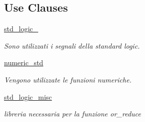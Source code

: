 \subsection*{Use Clauses}
 \begin{DoxyCompactItemize}
\item 
\mbox{\label{classUART__v1__0__S00__AXI_acd03516902501cd1c7296a98e22c6fcb}} 
\hyperlink{classUART__v1__0__S00__AXI_acd03516902501cd1c7296a98e22c6fcb}{std\+\_\+logic\+\_}   
\begin{DoxyCompactList}\small\item\em Sono utilizzati i segnali della standard logic. \end{DoxyCompactList}\item 
\mbox{\label{classUART__v1__0__S00__AXI_a2edc34402b573437d5f25fa90ba4013e}} 
\hyperlink{classUART__v1__0__S00__AXI_a2edc34402b573437d5f25fa90ba4013e}{numeric\+\_\+std}   
\begin{DoxyCompactList}\small\item\em Vengono utilizzate le funzioni numeriche. \end{DoxyCompactList}\item 
\mbox{\label{classUART__v1__0__S00__AXI_acb2d98d781f19c8f5f4109576ec45502}} 
\hyperlink{classUART__v1__0__S00__AXI_acb2d98d781f19c8f5f4109576ec45502}{std\+\_\+logic\+\_\+misc}   
\begin{DoxyCompactList}\small\item\em libreria necessaria per la funzione or\+\_\+reduce \end{DoxyCompactList}\end{DoxyCompactItemize}
